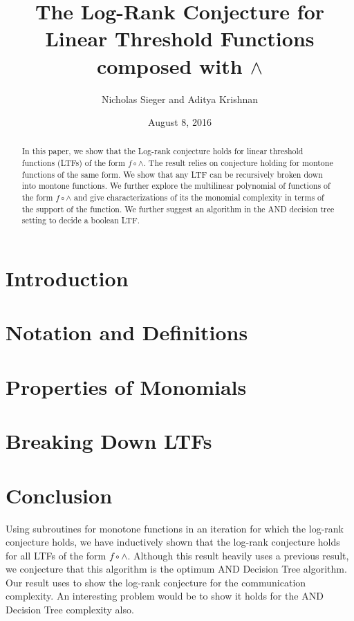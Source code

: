 \documentclass[a4paper]{article}
\title{The Log-Rank Conjecture for Linear Threshold Functions composed with $\wedge$}
\author{Nicholas Sieger and Aditya Krishnan}
\date{August 8, 2016}
\begin{document}
	\maketitle
	\begin{abstract}
		In this paper, we show that the Log-rank conjecture holds for linear threshold functions (LTFs) of the form $f \circ \wedge$. The result relies on conjecture holding for montone functions of the same form. We show that any LTF can be recursively broken down into montone functions. We further explore the multilinear polynomial of functions of the form $f \circ \wedge$ and give characterizations of its the monomial complexity in terms of the support of the function. We further suggest an algorithm in the \textsf{AND} decision tree setting to decide a boolean LTF.
	\end{abstract}
	\section{Introduction}
	
	\section{Notation and Definitions}
	
	\section{Properties of Monomials}
	
	\section{Breaking Down LTFs}
	
	\section{Conclusion}
	Using subroutines for monotone functions in an iteration for which the log-rank conjecture holds, we have inductively shown that the log-rank conjecture holds for all LTFs of the form $f \circ \wedge$. Although this result heavily uses a previous result, we conjecture that this algorithm is the optimum  AND Decision Tree algorithm. Our result uses \cite{Buhrman1999} to show the log-rank conjecture for the communication complexity. An interesting problem would be to show it holds for the AND Decision Tree complexity also. 
	
	
\end{document}
